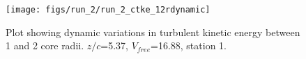 \begin{figure}[H]
\centering
\texttt{[image: figs/run\_2/run\_2\_ctke\_12rdynamic]}
\caption{Plot showing dynamic variations in turbulent kinetic energy between 1 and 2 core radii. $z/c$=5.37, $V_{free}$=16.88, station 1.}
\label{fig:run_2_ctke_12rdynamic}
\end{figure}


